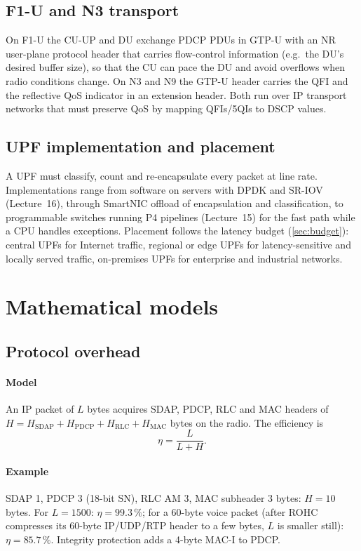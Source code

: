 \documentclass[11pt,a4paper]{article}
\begin{document}
\subsection{F1-U and N3 transport}
On F1-U the CU-UP and DU exchange PDCP PDUs in GTP-U with an NR user-plane protocol header that carries flow-control information (e.g.\ the DU's
desired buffer size), so that the CU can pace the DU and avoid overflows when radio conditions change. On N3 and N9 the GTP-U header carries
the QFI and the reflective QoS indicator in an extension header. Both run over IP transport networks that must preserve QoS by mapping
QFIs/5QIs to DSCP values.

\subsection{UPF implementation and placement}
A UPF must classify, count and re-encapsulate every packet at line rate. Implementations range from software on servers with DPDK and SR-IOV
(Lecture~16), through SmartNIC offload of encapsulation and classification, to programmable switches running P4 pipelines (Lecture~15) for
the fast path while a CPU handles exceptions. Placement follows the latency budget (\cref{sec:budget}): central UPFs for Internet traffic,
regional or edge UPFs for latency-sensitive and locally served traffic, on-premises UPFs for enterprise and industrial networks.

\section{Mathematical models}

\subsection{Protocol overhead}\label{sec:oh}
\paragraph{Model} An IP packet of $L$ bytes acquires SDAP, PDCP, RLC and MAC headers of $H = H_{\mathrm{SDAP}} + H_{\mathrm{PDCP}} + H_{\mathrm{RLC}} +
H_{\mathrm{MAC}}$ bytes on the radio. The efficiency is
\begin{equation}\label{eq:overhead}
  \eta = \frac{L}{L + H} .
\end{equation}
\paragraph{Example} SDAP 1, PDCP 3 (18-bit SN), RLC AM 3, MAC subheader 3 bytes: $H = 10$\,bytes. For $L = 1500$: $\eta = 99.3\,\%$; for a 60-byte voice
packet (after ROHC compresses its 60-byte IP/UDP/RTP header to a few bytes, $L$ is smaller still): $\eta = 85.7\,\%$. Integrity protection adds a
4-byte MAC-I to PDCP.
\end{document}
